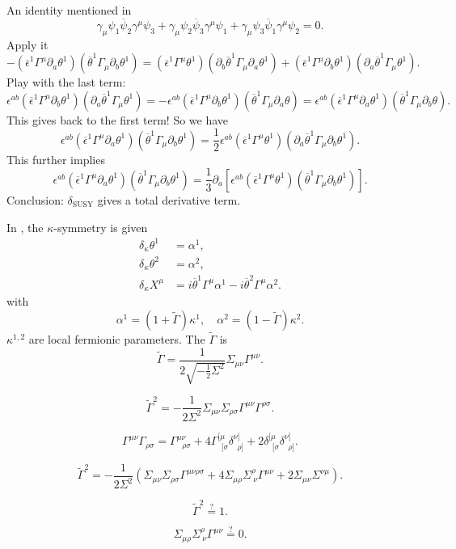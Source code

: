 An identity mentioned in 
\[
\gamma_\mu \psi_1 \overline{\psi}_2 \gamma^\mu \psi_3
+ \gamma_\mu \psi_2 \overline{\psi}_3 \gamma^\mu \psi_1
+ \gamma_\mu \psi_3 \overline{\psi}_1 \gamma^\mu \psi_2
=0
.\] 
Apply it
\[
- (\overline{\epsilon}^1 \Gamma^\mu \partial_a \theta^1)
(\overline{\theta}^1 \Gamma_\mu \partial_b \theta^1)
= (\overline{\epsilon}^1 \Gamma^\mu \theta^1)
(\partial_b \overline{\theta}^1 \Gamma_\mu \partial_a \theta^1)
+ (\overline{\epsilon}^1 \Gamma^\mu \partial_b \theta^1)
(\partial_a \overline{\theta}^1 \Gamma_\mu \theta^1)
.\] 
Play with the last term:
\[
	\epsilon^{ab}(\overline{\epsilon}^1 \Gamma^\mu \partial_b \theta^1)
	(\partial_a \overline{\theta}^1 \Gamma_\mu \theta^1)
	= -\epsilon^{ab}(\overline{\epsilon}^1 \Gamma^\mu \partial_b\theta^1)
	(\overline{\theta}^1 \Gamma_\mu \partial_a \theta)
	= \epsilon^{ab}(\overline{\epsilon}^1 \Gamma^\mu \partial_a \theta^1)
	(\overline{\theta}^1 \Gamma_\mu \partial_b \theta)
.\] 
This gives back to the first term!
So we have
\[
	\epsilon^{ab} (\overline{\epsilon}^1 \Gamma^\mu \partial_a \theta^1)
	(\overline{\theta}^1 \Gamma_\mu \partial_b \theta^1)
	=  \frac{1}{2} \epsilon^{ab} (\overline{\epsilon}^1 \Gamma^\mu \theta^1)
	(\partial_a \overline{\theta}^1 \Gamma_\mu \partial_b \theta^1)
.\] 
This further implies
\[
	\epsilon^{ab} (\overline{\epsilon}^1 \Gamma^\mu \partial_a \theta^1)
	(\overline{\theta}^1 \Gamma_\mu \partial_b \theta^1)
	=
	\frac{1}{3}\partial_a \left[ \epsilon^{ab} (\overline{\epsilon}^1
	\Gamma^\mu \theta^1) (\overline{\theta}^1 \Gamma_\mu
\partial_b \theta^1)\right]
.\] 
Conclusion: $\delta_{\text{SUSY}}$ gives a total derivative term.


In ,
the $\kappa$-symmetry is given
\begin{align*}
	\delta_{\kappa} \theta^1 &= \alpha^1,\\
	\delta_{\kappa} \theta^2 &= \alpha^2,\\ 
	\delta_{\kappa} X^\mu &= i \overline{\theta}^1 \Gamma^\mu \alpha^1
	- i \overline{\theta}^2 \Gamma^\mu \alpha^2.
\end{align*}
with
\[
	\alpha^1 = (1 + \tilde{\Gamma}) \kappa^1,\quad
	\alpha^2 = (1 - \tilde{\Gamma}) \kappa^2
.\] 
$\kappa^{1,2}$ are local fermionic parameters.
The $\tilde{\Gamma}$ is
\[
	\tilde{\Gamma} = \frac{1}{2\sqrt{-\frac{1}{2}\Sigma^2}} \Sigma_{\mu\nu}
	\Gamma^{\mu\nu}
.\] 

\[
	\tilde{\Gamma}^2 = - \frac{1}{2\Sigma^2}
	\Sigma_{\mu\nu} \Sigma_{\rho\sigma}
	\Gamma^{\mu\nu} \Gamma^{\rho\sigma}
.\] 

\[
	\Gamma^{\mu\nu} \Gamma_{\rho\sigma}
	= \Gamma^{\mu\nu}_{~~~\rho\sigma}
	+ 4 \Gamma^{[\mu}_{~~[\sigma} \delta^{\nu]}_{~~\rho]}
	+ 2 \delta^{[\mu}_{~~[\sigma} \delta^{\nu]}_{~~\rho]}
.\] 

\[
	\tilde{\Gamma}^2 = -\frac{1}{2\Sigma^2}
	\left( \Sigma_{\mu\nu}\Sigma_{\rho\sigma}\Gamma^{\mu\nu\rho\sigma} 
	+ 4 \Sigma_{\mu\rho}\Sigma^\rho_{~\nu}\Gamma^{\mu\nu}
+ 2 \Sigma_{\mu\nu}\Sigma^{\nu\mu}\right) 
.\] 

\[
	\tilde{\Gamma}^2 \stackrel{?}{=} 1
.\] 

\[
	\Sigma_{\mu\rho}\Sigma^\rho_{~\nu}\Gamma^{\mu\nu}
	\stackrel{?}{=} 0
.\] 
